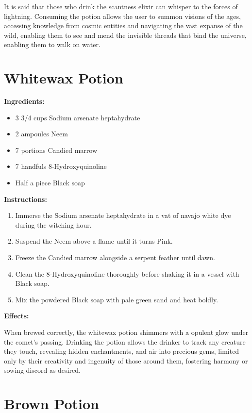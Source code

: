 \documentclass{article}
\begin{document}
It is said that those who drink the scantness elixir can whisper to the forces of lightning. Consuming the potion allows the user to summon visions of the ages, accessing knowledge from cosmic entities and navigating the vast expanse of the wild, enabling them to see and mend the invisible threads that bind the universe, enabling them to walk on water.

\newpage
\section*{Whitewax Potion}

\textbf{Ingredients:}

\begin{itemize}
  \item 3 3/4 cups Sodium arsenate heptahydrate
  \item 2 ampoules Neem
  \item 7 portions Candied marrow
  \item 7 handfuls 8-Hydroxyquinoline
  \item Half a piece Black soap
\end{itemize}

\textbf{Instructions:}

\begin{enumerate}
  \item Immerse the Sodium arsenate heptahydrate in a vat of navajo white dye during the witching hour.
  \item Suspend the Neem above a flame until it turns Pink.
  \item Freeze the Candied marrow alongside a serpent feather until dawn.
  \item Clean the 8-Hydroxyquinoline thoroughly before shaking it in a vessel with Black soap.
  \item Mix the powdered Black soap with pale green sand and heat boldly.
\end{enumerate}

\textbf{Effects:}

When brewed correctly, the whitewax potion shimmers with a opulent glow under the comet’s passing. Drinking the potion allows the drinker to track any creature they touch, revealing hidden enchantments, and air into precious gems, limited only by their creativity and ingenuity of those around them, fostering harmony or sowing discord as desired.

\newpage
\section*{Brown Potion}
\end{document}
